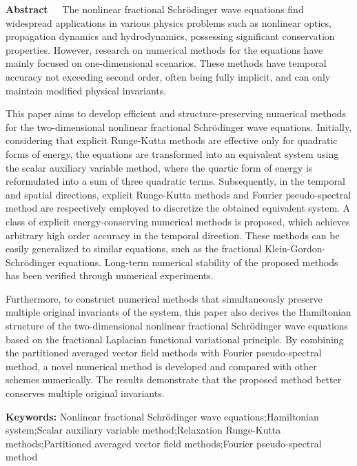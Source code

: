 \begin{EnglishAbstract}
\item {\bf Abstract\ \ } 
The nonlinear fractional Schr{\"o}dinger wave equations find widespread applications in various physics problems such as nonlinear optics, propagation dynamics and hydrodynamics, possessing significant conservation properties. 
However, research on numerical methods for the equations have mainly focused on one-dimensional scenarios. These methods have temporal accuracy not exceeding second order, often being fully implicit, and can only maintain modified physical invariants.

This paper aims to develop efficient and structure-preserving numerical methods for the two-dimensional nonlinear fractional Schr{\"o}dinger wave equations.
Initially, considering that explicit Runge-Kutta methods are effective only for quadratic forms of energy, the equations are transformed into an equivalent system using the scalar auxiliary variable method, 
where the quartic form of energy is reformulated into a sum of three quadratic terms. 
Subsequently, in the temporal and spatial directions, explicit Runge-Kutta methods and Fourier pseudo-spectral method are respectively employed to discretize the obtained equivalent system. 
A class of explicit energy-conserving numerical methods is proposed, which achieves arbitrary high order accuracy in the temporal direction. 
These methods can be easily generalized to similar equations, such as the fractional Klein-Gordon-Schr{\"o}dinger equations.
Long-term numerical stability of the proposed methods has been verified through numerical experiments.

Furthermore, to construct numerical methods that simultaneously preserve multiple original invariants of the system, this paper also derives the Hamiltonian structure of the two-dimensional nonlinear fractional Schr{\"o}dinger wave equations based on the fractional Laplacian functional variational principle. 
By combining the partitioned averaged vector field methods with Fourier pseudo-spectral method, a novel numerical method is developed and compared with other schemes numerically. The results demonstrate that the proposed method better conserves multiple original invariants.

\item {\bf Keywords:} Nonlinear fractional Schr{\"o}dinger wave equations;\quad Hamiltonian system;\quad Scalar auxiliary variable method;\quad Relaxation Runge-Kutta methods;\quad Partitioned averaged vector field methods;\quad Fourier pseudo-spectral method
\end{EnglishAbstract}